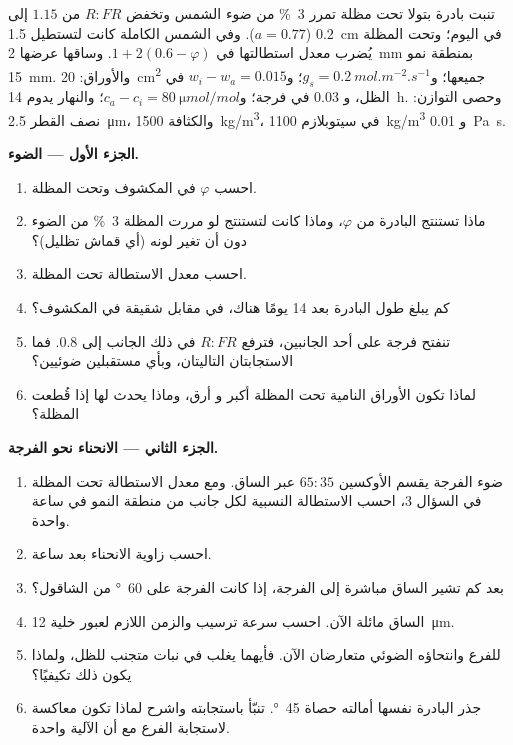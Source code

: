 \begin{problem}
\label{pb:b2:plant-plasticity:1}
تنبت بادرة بتولا تحت مظلة تمرر
\qty{3}{\%} من ضوء الشمس وتخفض $R{:}FR$ من $1.15$ إلى $0.2$
($a = 0.77$). وفي الشمس الكاملة كانت لتستطيل \qty{1.5}{cm} في اليوم؛
وتحت المظلة يُضرب معدل استطالتها في $1 +
2(0.6 - \varphi)$. وساقها عرضها \qty{2}{mm} بمنطقة نمو
\qty{15}{mm}. والأوراق: \qty{20}{cm^2} جميعها؛ و$g_s =
\qty{0.2}{mol.m^{-2}.s^{-1}}$؛ و$w_i - w_a = 0.015$ في الظل، و
$0.03$ في فرجة؛ و$c_a - c_i = \qty{80}{\micro mol/mol}$؛ والنهار
يدوم \qty{14}{h}. وحصى التوازن: نصف القطر \qty{2.5}{\micro m}، والكثافة
\qty{1500}{kg/m^3}، في سيتوبلازم \qty{1100}{kg/m^3} و
\qty{0.01}{Pa.s}.

\medskip
\noindent\textbf{الجزء الأول --- الضوء.}
\begin{enumerate}
  \item احسب $\varphi$ في المكشوف وتحت المظلة.
  \item ماذا تستنتج البادرة من $\varphi$، وماذا كانت
        لتستنتج لو مررت المظلة \qty{3}{\%} من
        الضوء دون أن تغير لونه (أي قماش تظليل)؟
  \item احسب معدل الاستطالة تحت المظلة.
  \item كم يبلغ طول البادرة بعد 14 يومًا هناك، في مقابل
        شقيقة في المكشوف؟
  \item تنفتح فرجة على أحد الجانبين، فترفع $R{:}FR$ في ذلك الجانب إلى
        $0.8$. فما الاستجابتان التاليتان، وبأي مستقبلين
        ضوئيين؟
  \item لماذا تكون الأوراق النامية تحت المظلة أكبر و
        أرق، وماذا يحدث لها إذا قُطعت المظلة؟
\end{enumerate}

\medskip
\noindent\textbf{الجزء الثاني --- الانحناء نحو الفرجة.}
\begin{enumerate}[resume]
  \item ضوء الفرجة يقسم الأوكسين $65 : 35$ عبر
        الساق. ومع معدل الاستطالة تحت المظلة في السؤال 3، احسب
        الاستطالة النسبية لكل جانب من منطقة النمو في
        ساعة واحدة.
  \item احسب زاوية الانحناء بعد ساعة.
  \item بعد كم تشير الساق مباشرة إلى الفرجة، إذا كانت
        الفرجة على \qty{60}{\degree} من الشاقول؟
  \item الساق مائلة الآن. احسب سرعة ترسيب
         والزمن اللازم لعبور خلية \qty{12}{\micro m}.
  \item {} للفرع وانتحاؤه الضوئي متعارضان الآن.
        فأيهما يغلب في نبات متجنب للظل، ولماذا يكون ذلك
        تكيفيًا؟
  \item جذر البادرة نفسها أمالته حصاة \qty{45}{\degree}. تنبّأ
        باستجابته واشرح لماذا تكون معاكسة لاستجابة الفرع مع أن
        الآلية واحدة.
\end{enumerate}


\end{problem}
